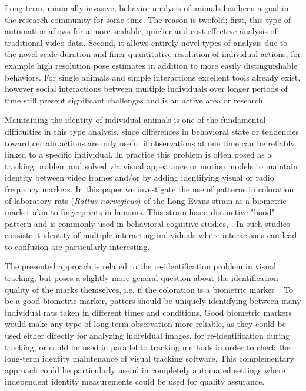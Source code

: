 \documentclass[conference,10pt,times,letter]{IEEEtran}
\begin{document}
Long-term, minimally invasive, behavior analysis of animals has been a goal in the research community for some time. The reason is twofold; first, this type of automation allows for a more scalable, quicker and cost effective analysis of traditional video data. Second, it allows entirely novel types of analysis due to the novel scale duration and finer quantitative resolution of individual actions, for example high resolution pose estimates in addition to more easily distinguishable behaviors. For single animals and simple interactions excellent tools already exist, however social interactions between multiple individuals over longer periods of time still present significant challenges and is an active area or research~\cite{weissbrod2013automated}\cite{ohayon2013multiday}\cite{de2012computerized}.

Maintaining the identity of individual animals is one of the fundamental difficulties in this type analysis, since differences in behavioral state or tendencies toward certain actions are only useful if observations at one time can be reliably linked to a specific individual. In practice this problem is often posed as a tracking problem and solved via visual appearance or motion models to maintain identity between video frames and/or by adding identifying visual or radio frequency markers. In this paper we investigate the use of patterns in coloration of laboratory rats ({\it Rattus norvegicus}) of the Long-Evans strain as a biometric marker akin to fingerprints in humans. This strain has a distinctive "hood" pattern and is commonly used in behavioral cognitive studies, \cite{lambert2016natural,guarraci2016exposure,turner2014comprehensive}. In such studies consistent identity of multiple interacting individuals where interactions can lead to confusion are particularly interesting. 

The presented approach is related to the re-identification problem in visual tracking, but poses a slightly more general question about the identification quality of the marks themselves, i.e. if the coloration is a biometric marker~\cite{kuhl2013animal}. To be a good biometric marker, patters should be uniquely identifying between many individual rats taken in different times and conditions.
Good biometric markers would make any type of long term observation more reliable, as they could be used either directly for analyzing individual images, for re-identification during tracking, or could be used in parallel to tracking methods in order to check the long-term identity maintenance of visual tracking software. This complementary approach could be particularly useful in completely automated settings where independent identity measurements could be used for quality assurance.  
 
\end{document}
